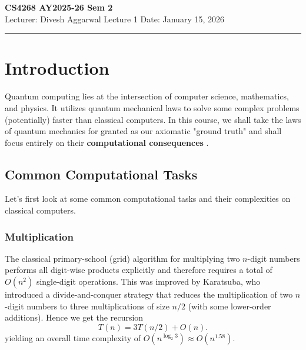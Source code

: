 


% 



\newpage
\noindent
\textbf{CS4268 AY2025-26 Sem 2}
\\
\noindent
Lecturer: Divesh Aggarwal
\hfill
Lecture 1                      %
\hfill
Date: January 15, 2026          %


\noindent
\rule{\textwidth}{1pt}

\medskip


\section{Introduction}
Quantum computing lies at the intersection of computer science, mathematics, and physics. It utilizes quantum mechanical laws to solve some complex problems (potentially) faster than classical computers. In this course, we shall take the laws of quantum mechanics for granted as our axiomatic "ground truth" and shall focus entirely on their \textbf{computational consequences} \cite{NC10}.

\subsection{Common Computational Tasks}
Let's first look at some common computational tasks and their complexities on classical computers.
\subsubsection{Multiplication}
The classical primary-school (grid) algorithm for multiplying two \(n\)-digit numbers performs all digit-wise products explicitly and therefore requires a total of \(O(n^{2})\) single-digit operations. This was improved by Karatsuba, who introduced a divide-and-conquer strategy that reduces the multiplication of two \(n\)-digit numbers to three multiplications of size \(n/2\) (with some lower-order additions). Hence we get the recursion
\[
        T(n) = 3T(n/2) + O(n).
\]
yielding an overall time complexity of \(O\!\left(n^{\log_{2} 3}\right) \approx O\!\left(n^{1.58}\right)\).

